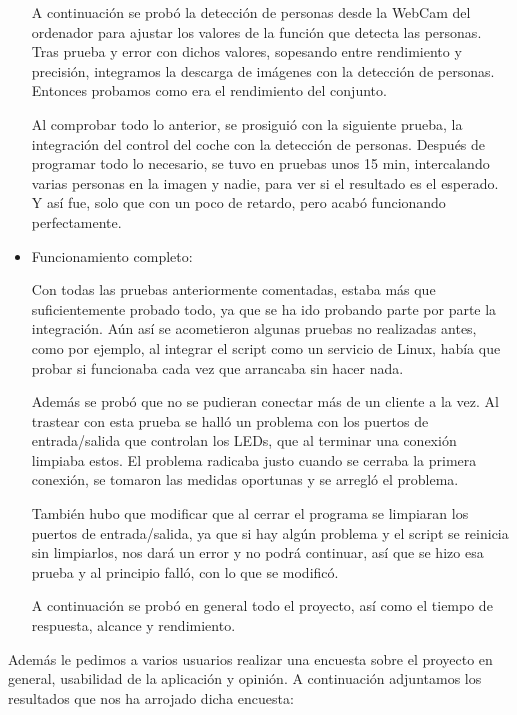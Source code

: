 \documentclass{pclass}
\begin{document}
\begin{itemize}
		A continuación se probó la detección de personas desde la WebCam del ordenador para ajustar los valores de la función que detecta las personas. Tras prueba y error con dichos valores, sopesando entre rendimiento y precisión, integramos la descarga de imágenes con la detección de personas. Entonces probamos como era el rendimiento del conjunto.
		
		Al comprobar todo lo anterior, se prosiguió con la siguiente prueba, la integración del control del coche con la detección de personas. Después de programar todo lo necesario, se tuvo en pruebas unos 15 min, intercalando varias personas en la imagen y nadie, para ver si el resultado es el esperado. Y así fue, solo que con un poco de retardo, pero acabó funcionando perfectamente. 		
		
		
	
	\item Funcionamiento completo:
	
		Con todas las pruebas anteriormente comentadas, estaba más que suficientemente probado todo, ya que se ha ido probando parte por parte la integración. Aún así se acometieron algunas pruebas no realizadas antes, como por ejemplo, al integrar el script como un servicio de Linux, había que probar si funcionaba cada vez que arrancaba sin hacer nada.
		
		Además se probó que no se pudieran conectar más de un cliente a la vez. Al trastear con esta prueba se halló un problema con los puertos de entrada/salida que controlan los LEDs, que al terminar una conexión limpiaba estos. El problema radicaba justo cuando se cerraba la primera conexión, se tomaron las medidas oportunas y se arregló el problema.
		
		También hubo que modificar que al cerrar el programa se limpiaran los puertos de entrada/salida, ya que si hay algún problema y el script se reinicia sin limpiarlos, nos dará un error y no podrá continuar, así que se hizo esa prueba y al principio falló, con lo que se modificó.
		
		A continuación se probó en general todo el proyecto, así como el tiempo de respuesta, alcance y rendimiento.	
		
	
\end{itemize}

Además le pedimos a varios usuarios realizar una encuesta sobre el proyecto en general, usabilidad de la aplicación y opinión. A continuación adjuntamos los resultados que nos ha arrojado dicha encuesta:
\end{document}
